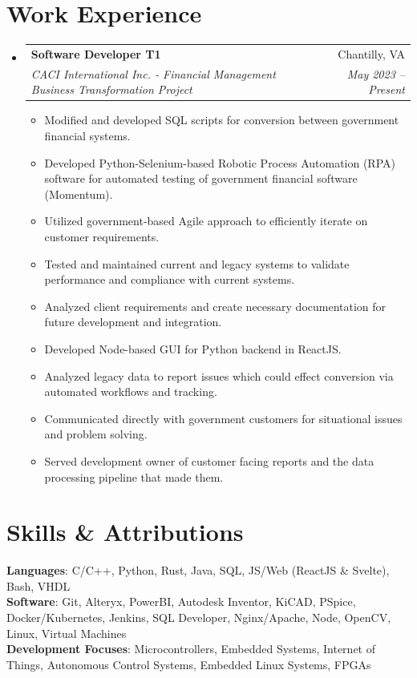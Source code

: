 \documentclass[letterpaper,11pt]{article}
\makeatletter
\newcommand{\resumeItem}[1]{
  \item\small{
    {#1 \vspace{-1pt}}
  }
}
\newcommand{\resumeSubheading}[4]{
  \vspace{-1pt}\item
    \begin{tabular*}{0.97\textwidth}[t]{l@{\extracolsep{\fill}}r}
      \textbf{#1} & #2 \\
      \textit{\small#3} & \textit{\small #4} \\
    \end{tabular*}\vspace{-5pt}
}
\newcommand{\resumeSubHeadingListStart}{\begin{itemize}[leftmargin=0.15in, label={}]}
\newcommand{\resumeSubHeadingListEnd}{\end{itemize}}
\newcommand{\resumeItemListStart}{\begin{itemize}}
\newcommand{\resumeItemListEnd}{\end{itemize}\vspace{-5pt}}
\makeatother
\begin{document}
\section{Work Experience}
  \resumeSubHeadingListStart

    \resumeSubheading
      {Software Developer T1}{Chantilly, VA}
      {CACI International Inc. - Financial Management Business Transformation Project}{May 2023 – Present}
      \resumeItemListStart
        \resumeItem{Modified and developed SQL scripts for conversion between government financial systems.}
        \resumeItem{Developed Python-Selenium-based Robotic Process Automation (RPA) software for automated testing of government financial software (Momentum).}
        \resumeItem{Utilized government-based Agile approach to efficiently iterate on customer requirements.}
        \resumeItem{Tested and maintained current and legacy systems to validate performance and compliance with current systems.}
        \resumeItem{Analyzed client requirements and create necessary documentation for future development and integration.}
        \resumeItem{Developed Node-based GUI for Python backend in ReactJS.}
        \resumeItem{Analyzed legacy data to report issues which could effect conversion via automated workflows and tracking.}
        \resumeItem{Communicated directly with government customers for situational issues and problem solving.}
        \resumeItem{Served development owner of customer facing reports and the data processing pipeline that made them.}
      \resumeItemListEnd
      
    \resumeSubHeadingListEnd

%
\section{Skills \& Attributions}
 \begin{itemize}[leftmargin=0.15in, label={}]
    \small{\item{
     \textbf{Languages}{: C/C++, Python, Rust, Java, SQL, JS/Web (ReactJS \& Svelte), Bash, VHDL} \\
     \textbf{Software}{: Git, Alteryx, PowerBI, Autodesk Inventor, KiCAD, PSpice, Docker/Kubernetes, Jenkins, SQL Developer, 
     Nginx/Apache, Node, OpenCV, Linux, Virtual Machines} \\
     \textbf{Development Focuses}{: Microcontrollers, Embedded Systems, Internet of Things, Autonomous Control Systems, Embedded Linux 
     Systems, FPGAs} \\
    }}
 \end{itemize}
\end{document}
